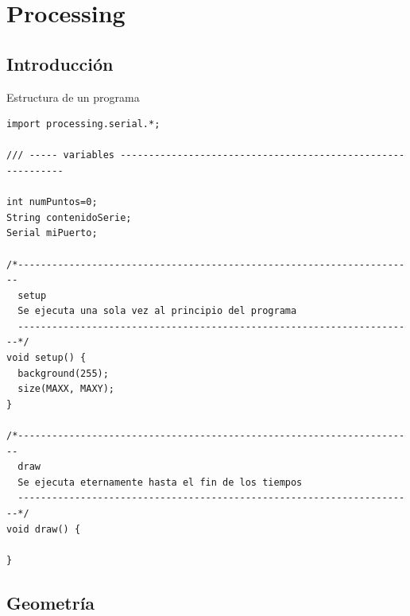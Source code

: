 

\section{Processing}

\subsection{Introducción}

\begin{frame}[fragile]{Estructura de un programa}
  \begin{lstlisting}
import processing.serial.*;

/// ----- variables ------------------------------------------------------------

int numPuntos=0;
String contenidoSerie;
Serial miPuerto;

/*----------------------------------------------------------------------
  setup
  Se ejecuta una sola vez al principio del programa
  ----------------------------------------------------------------------*/
void setup() {   
  background(255);
  size(MAXX, MAXY); 
}

/*----------------------------------------------------------------------
  draw
  Se ejecuta eternamente hasta el fin de los tiempos
  ----------------------------------------------------------------------*/
void draw() { 

}
  \end{lstlisting}
\end{frame}

\subsection{Geometría}

